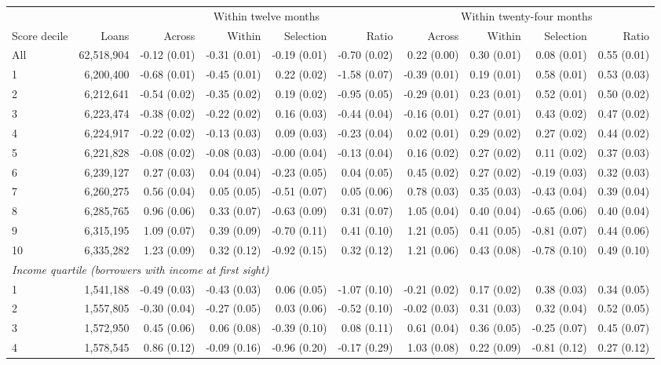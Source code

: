\begin{tabular}{lrrrrrrrrr}
\toprule
 & & \multicolumn{4}{c}{Within twelve months} & \multicolumn{4}{c}{Within twenty-four months} \\
\cmidrule(lr){3-6}\cmidrule(lr){7-10}
Score decile & Loans & Across & Within & Selection & Ratio & Across & Within & Selection & Ratio \\
\midrule
All & 62,518,904 & -0.12 (0.01) & -0.31 (0.01) & -0.19 (0.01) & -0.70 (0.02) & 0.22 (0.00) & 0.30 (0.01) & 0.08 (0.01) & 0.55 (0.01) \\
1 & 6,200,400 & -0.68 (0.01) & -0.45 (0.01) & 0.22 (0.02) & -1.58 (0.07) & -0.39 (0.01) & 0.19 (0.01) & 0.58 (0.01) & 0.53 (0.03) \\
2 & 6,212,641 & -0.54 (0.02) & -0.35 (0.02) & 0.19 (0.02) & -0.95 (0.05) & -0.29 (0.01) & 0.23 (0.01) & 0.52 (0.01) & 0.50 (0.02) \\
3 & 6,223,474 & -0.38 (0.02) & -0.22 (0.02) & 0.16 (0.03) & -0.44 (0.04) & -0.16 (0.01) & 0.27 (0.01) & 0.43 (0.02) & 0.47 (0.02) \\
4 & 6,224,917 & -0.22 (0.02) & -0.13 (0.03) & 0.09 (0.03) & -0.23 (0.04) & 0.02 (0.01) & 0.29 (0.02) & 0.27 (0.02) & 0.44 (0.02) \\
5 & 6,221,828 & -0.08 (0.02) & -0.08 (0.03) & -0.00 (0.04) & -0.13 (0.04) & 0.16 (0.02) & 0.27 (0.02) & 0.11 (0.02) & 0.37 (0.03) \\
6 & 6,239,127 & 0.27 (0.03) & 0.04 (0.04) & -0.23 (0.05) & 0.04 (0.05) & 0.45 (0.02) & 0.27 (0.02) & -0.19 (0.03) & 0.32 (0.03) \\
7 & 6,260,275 & 0.56 (0.04) & 0.05 (0.05) & -0.51 (0.07) & 0.05 (0.06) & 0.78 (0.03) & 0.35 (0.03) & -0.43 (0.04) & 0.39 (0.04) \\
8 & 6,285,765 & 0.96 (0.06) & 0.33 (0.07) & -0.63 (0.09) & 0.31 (0.07) & 1.05 (0.04) & 0.40 (0.04) & -0.65 (0.06) & 0.40 (0.04) \\
9 & 6,315,195 & 1.09 (0.07) & 0.39 (0.09) & -0.70 (0.11) & 0.41 (0.10) & 1.21 (0.05) & 0.41 (0.05) & -0.81 (0.07) & 0.44 (0.06) \\
10 & 6,335,282 & 1.23 (0.09) & 0.32 (0.12) & -0.92 (0.15) & 0.32 (0.12) & 1.21 (0.06) & 0.43 (0.08) & -0.78 (0.10) & 0.49 (0.10) \\
\midrule
\multicolumn{10}{l}{\emph{Income quartile (borrowers with income at first sight)}} \\
1 & 1,541,188 & -0.49 (0.03) & -0.43 (0.03) & 0.06 (0.05) & -1.07 (0.10) & -0.21 (0.02) & 0.17 (0.02) & 0.38 (0.03) & 0.34 (0.05) \\
2 & 1,557,805 & -0.30 (0.04) & -0.27 (0.05) & 0.03 (0.06) & -0.52 (0.10) & -0.02 (0.03) & 0.31 (0.03) & 0.32 (0.04) & 0.52 (0.05) \\
3 & 1,572,950 & 0.45 (0.06) & 0.06 (0.08) & -0.39 (0.10) & 0.08 (0.11) & 0.61 (0.04) & 0.36 (0.05) & -0.25 (0.07) & 0.45 (0.07) \\
4 & 1,578,545 & 0.86 (0.12) & -0.09 (0.16) & -0.96 (0.20) & -0.17 (0.29) & 1.03 (0.08) & 0.22 (0.09) & -0.81 (0.12) & 0.27 (0.12) \\
\bottomrule
\end{tabular}
